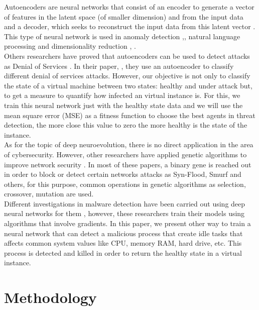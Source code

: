 \documentclass{iosart2c}
\begin{document}
Autoencoders are neural networks that consist of an encoder to generate a vector of features in the latent space (of smaller dimension) and from the input data and a decoder, which seeks to reconstruct the input data from this latent vector \cite{autoencoders_nlp1}. This type of neural network is used in anomaly detection \cite{anomaly1, anomaly3},\cite{anomaly4}, natural language processing \cite{autoencoders_nlp1} and dimensionality reduction \cite{dimred1}, \cite{dimred2}.\\

Others researchers have proved that autoencoders can be used to detect attacks as Denial of Services \cite{autoencoderdos}. In their paper, \citeauthor{autoencoderdos}, they use an autoencoder to classify different denial of services attacks. However, our objective is not only to classify the state of a virtual machine between two states: healthy and under attack but, to get a measure to quantify how infected an virtual instance is. For this, we train this neural network just with the healthy state data and we will use the mean square error (MSE) as a fitness function to choose the best agents in threat detection, the more close this value to zero the more healthy is the state of the instance.\\

As for the topic of deep neuroevolution, there is no direct application in the area of cybersecurity. However, other researchers have applied genetic algorithms to improve network security \cite{GA1, GA2, GA3}. In most of these papers, a binary gene is reached out in order to block or detect certain networks attacks as Syn-Flood, Smurf and others, for this purpose, common operations in genetic algorithms as selection, crossover, mutation are used.\\

Different investigations in malware detection have been carried out using deep neural networks for them \cite{malwarednn1, malwarednn2,malwarednn3}, however, these researchers train their models using algorithms that involve gradients. In this paper, we present other way to train a neural network that can detect a malicious process that create idle tasks that affects common system values like CPU, memory RAM, hard drive, etc. This process is detected and killed in order to return the healthy state in a virtual instance.

\section{Methodology}
\end{document}
